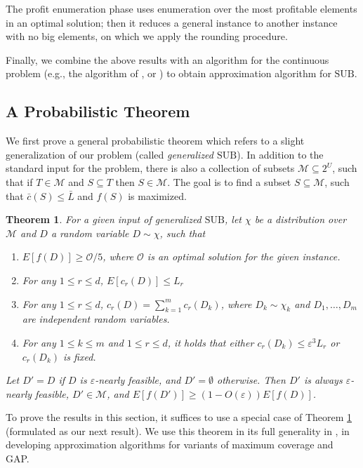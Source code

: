 \documentclass[11pt]{article}
\newtheorem{theorem}{Theorem}[section]
\newcommand{\eps}{\varepsilon}
\newcommand{\bL}{\bar{L}}
\newcommand{\bc}{\bar{c}}
\newcommand{\mO}{\mathcal{O}}
\newcommand{\mM}{\mathcal{M}}
\newcommand{\SUB}{\mbox{SUB}}
\begin{document}
{The profit enumeration phase uses enumeration over the most
profitable elements in an optimal solution; then it reduces
a general instance to another instance with no big elements,
on which we apply the rounding procedure.

Finally, we combine the above results with an algorithm for the
continuous problem (e.g., the algorithm of \cite{Vo08}, or
\cite{LMNS09}) to obtain approximation algorithm for $\SUB$.

\subsection{A Probabilistic Theorem}
\label{sec:prb_claim}

We first prove a general probabilistic
theorem which refers to a slight generalization of our problem
(called {\em generalized $\SUB$}).
In addition to the standard
input for the problem, there is also a collection of subsets $\mM\subseteq 2^U$,
such that if $T\in \mM$ and $S \subseteq T$
then $S\in \mM$. The goal is  to find
a subset $S \subseteq \mM$, such that  $\bc(S) \leq \bL$
and $f(S)$ is maximized.

\begin{theorem}
\label{thm:prb_claim}
For a given input of generalized $\SUB$,
let $\chi$ be a distribution over $\mM$
and $D$ a random variable $D \sim \chi$, such that
\begin{enumerate}
\item $E \left[ f(D) \right] \geq \mO/5 $, where $\mO$ is an optimal
solution for the given instance.
\item For any $1\leq r \leq d$, $E[c_r(D) ]  \leq L_r$
\item For any $1 \leq r \leq d$, $c_r(D)= \sum_{k=1}^{m} c_r(D_k)$, where
 $D_k \sim \chi_k$ and $D_1, \ldots , D_m$ are independent random
variables.
\item
\label{thm:prb_claim:c4}
For any $1\leq k  \leq m$ and $1\leq r \leq d$, it holds that
either $c_r(D_k) \leq \eps ^3 L_r$ or $c_r(D_k)$ is fixed.
\end{enumerate}
Let $D'=D$ if $D$ is $\eps$-nearly feasible, and $D'=\emptyset$ otherwise. Then $D'$ is
always $\eps$-nearly feasible, $D' \in \mM$, and
$E[f(D')] \geq (1-O(\eps) ) E[f(D)]$.
\end{theorem}

To prove the results in this section, it suffices to use a special case of Theorem
 \ref{thm:prb_claim} (formulated as our next result). We use
this theorem in its full generality in \cite{full}, in developing approximation
 algorithms for variants of maximum coverage and GAP.

}
\end{document}
